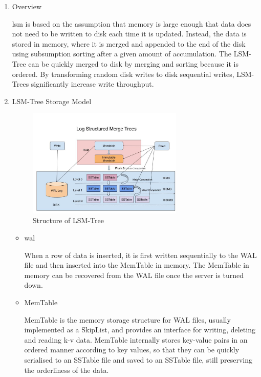 \begin{enumerate}
\item Overview

\ac{lsm} is based on the assumption that memory is large enough that data does not need to be written to disk each time it is updated. Instead, the data is stored in memory, where it is merged and appended to the end of the disk using subsumption sorting after a given amount of accumulation. The LSM-Tree can be quickly merged to disk by merging and sorting because it is ordered\cite{lsm_tree}. By transforming random disk writes to disk sequential writes, LSM-Trees significantly increase write throughput.

\item LSM-Tree Storage Model

\begin{figure}[hbt!]
	\centering
 	\includegraphics[width=0.7\textwidth]{gfx/structure_lsm.png}
	\caption{Structure of LSM-Tree}
	\label{fig:lsm_structure}
\end{figure}

\begin{itemize}
    \item \ac{wal}
    
    When a row of data is inserted, it is first written sequentially to the WAL file and then inserted into the MemTable in memory\cite{lsm_tree}. The MemTable in memory can be recovered from the WAL file once the server is turned down.
    
    \item MemTable
    
    MemTable is the memory storage structure for WAL files, usually implemented as a SkipList, and provides an interface for writing, deleting and reading k-v data. MemTable internally stores key-value pairs in an ordered manner according to key values, so that they can be quickly serialised to an SSTable file and saved to an SSTable file, still preserving the orderliness of the data\cite{lsm_tree}.
    

\end{itemize}
\end{enumerate}
